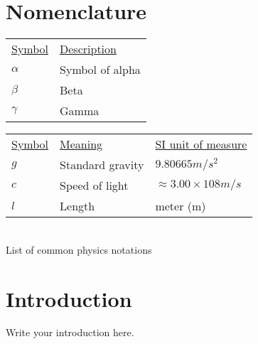 \chapter*{Nomenclature}
\pagestyle{plain}

\begin{center}
  \begin{tabular}{C{0.2\textwidth} C{0.4\textwidth}}
    \hline
    \underline{Symbol} & \centerline{\underline{Description}} \\
    $\alpha$	&	Symbol of alpha 	\\
    $\beta$		&	Beta				\\
    $\gamma$	&	Gamma				\\
    \hline
  \end{tabular}
\end{center}

\EmptyLine

\begin{center}
  \begin{tabular}{C{0.2\textwidth} C{0.4\textwidth} C{0.35\textwidth}}
    \hline
    \underline{Symbol} & \underline{Meaning} & \underline{SI unit of measure}	\\
    $g$		&	Standard gravity	&	$9.80665 m/s^2$							\\
    $c$		&	Speed of light		&	$\approx3.00\times108 m/s$				\\
    $l$		&	Length				&	meter (m)								\\
 	\hline
  \end{tabular}
  \vspace{0.1cm}\\{List of common physics notations}
\end{center}
\clearpage
{}


\setcounter{page}{1}
\newpage
{}
\chapter{Introduction}
\pagestyle{plain}

Write your introduction here.

\clearpage
{}



